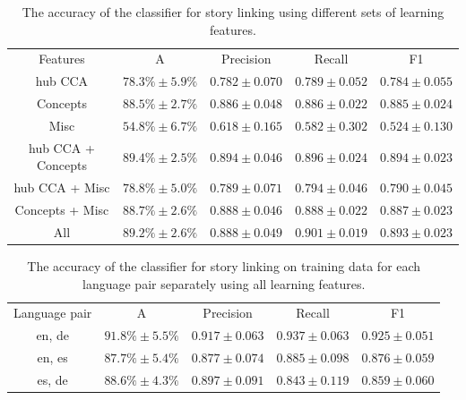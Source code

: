 \documentclass[twoside,11pt]{article}
\begin{document}
\begin{table}[h]
\caption{The accuracy of the classifier for story linking using different sets of learning features.}
\label{table:linkingEval}
\begin{center}
\begin{tabular}{|c|c|c|c|c|}
  \hline
  \cline{1-5}
  Features & A & Precision & Recall & F1 \\ \cline{1-5}
  hub CCA & $78.3\% \pm 5.9\%$ & $0.782 \pm 0.070$ & $0.789 \pm 0.052$ & $0.784 \pm 0.055$ \\ \cline{1-5}
  Concepts & $88.5\% \pm 2.7\%$ & $0.886 \pm 0.048$ & $0.886 \pm 0.022$ & $0.885 \pm 0.024$ \\ \cline{1-5}
  Misc & $54.8\% \pm 6.7\%$ & $0.618 \pm 0.165$ & $0.582 \pm 0.302$ & $0.524 \pm 0.130$ \\ \cline{1-5}
  hub CCA + Concepts & $89.4\% \pm 2.5\%$ & $0.894 \pm 0.046$ & $0.896 \pm 0.024$ & $0.894 \pm 0.023$ \\ \cline{1-5}
  hub CCA + Misc & $78.8\% \pm 5.0\%$ & $0.789 \pm 0.071$ & $0.794 \pm 0.046$ & $0.790 \pm 0.045$ \\ \cline{1-5}
  Concepts + Misc & $88.7\% \pm 2.6\%$ & $0.888 \pm 0.046$ & $0.888 \pm 0.022$ & $0.887 \pm 0.023$ \\ \cline{1-5}
  All & $89.2\% \pm 2.6\%$ & $0.888 \pm 0.049$ & $0.901 \pm 0.019$ & $0.893 \pm 0.023$ \\ \cline{1-5}
  \hline
\end{tabular}
\end{center}
\end{table}

\begin{table}[h]
\caption{The accuracy of the classifier for story linking on training data for each language pair separately using all learning features.}
\label{table:langPairEval}
\begin{center}
\begin{tabular}{|c|c|c|c|c|}
  \hline
  \cline{1-5}
  Language pair & A & Precision & Recall & F1 \\ \cline{1-5}
  en, de & $91.8\% \pm 5.5\%$ & $0.917 \pm 0.063$ & $0.937 \pm 0.063$ & $0.925 \pm 0.051$ \\ \cline{1-5}
  en, es & $87.7\% \pm 5.4\%$ & $0.877 \pm 0.074$ & $0.885 \pm 0.098$ & $0.876 \pm 0.059$ \\ \cline{1-5}
  es, de & $88.6\% \pm 4.3\%$ & $0.897 \pm 0.091$ & $0.843 \pm 0.119$ & $0.859 \pm 0.060$ \\ \cline{1-5}
  \hline
\end{tabular}
\end{center}
\end{table}
\end{document}
